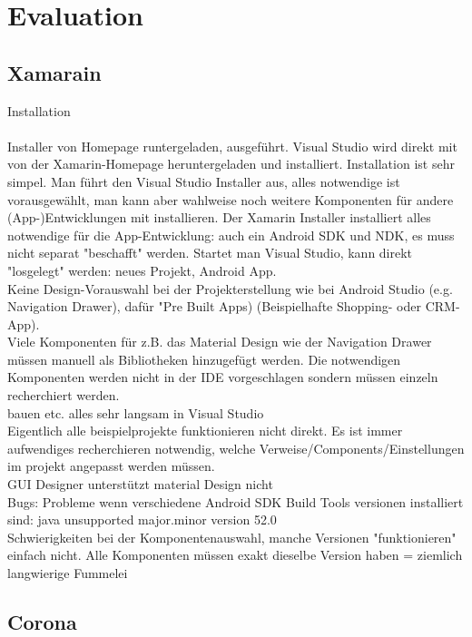 \chapter{Evaluation}

\section{Xamarain}

Installation
\\
\\
Installer von Homepage runtergeladen, ausgeführt. Visual Studio wird direkt mit von der Xamarin-Homepage heruntergeladen und installiert. Installation ist sehr simpel. Man führt den Visual Studio Installer aus, alles notwendige ist vorausgewählt, man kann aber wahlweise noch weitere Komponenten für andere (App-)Entwicklungen mit installieren. Der Xamarin Installer installiert alles notwendige für die App-Entwicklung: auch ein Android SDK und NDK, es muss nicht separat "beschafft" werden. Startet man Visual Studio, kann direkt "losgelegt" werden: neues Projekt, Android App. 
\\
Keine Design-Vorauswahl bei der Projekterstellung wie bei Android Studio (e.g. Navigation Drawer), dafür "Pre Built Apps) (Beispielhafte Shopping- oder CRM-App). 
\\
Viele Komponenten für z.B. das Material Design wie der Navigation Drawer müssen manuell als Bibliotheken hinzugefügt werden. Die notwendigen Komponenten werden nicht in der IDE vorgeschlagen sondern müssen einzeln recherchiert werden. 
\\
bauen etc. alles sehr langsam in Visual Studio
\\
Eigentlich alle beispielprojekte funktionieren nicht direkt. Es ist immer aufwendiges recherchieren notwendig, welche Verweise/Components/Einstellungen im projekt angepasst werden müssen.
\\
GUI Designer unterstützt material Design nicht
\\
Bugs: Probleme wenn verschiedene Android SDK Build Tools versionen installiert sind: java unsupported major.minor version 52.0 
\\
Schwierigkeiten bei der Komponentenauswahl, manche Versionen "funktionieren" einfach nicht. Alle Komponenten müssen exakt dieselbe Version haben = ziemlich langwierige Fummelei

\section{Corona}

